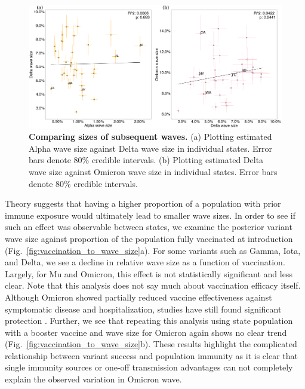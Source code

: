\documentclass[11pt,oneside,letterpaper]{article}
\begin{document}
\begin{figure}[h!]
  \centering
  \includegraphics[width=\linewidth]{figs/wave_size_to_wave_size.png}
  \caption{\textbf{Comparing sizes of subsequent waves.}
    (a) Plotting estimated Alpha wave size against Delta wave size in individual states. Error bars denote 80\% credible intervals.
    (b) Plotting estimated Delta wave size against Omicron wave size in individual states. Error bars denote 80\% credible intervals.
  }
  \label{fig:wave_size_to_wave_size}
\end{figure}

Theory suggests that having a higher proportion of a population with prior immune exposure would ultimately lead to smaller wave sizes.
In order to see if such an effect was observable between states, we examine the posterior variant wave size against proportion of the population fully vaccinated at introduction (Fig.\ \ref{fig:vaccination_to_wave_size}a).
For some variants such as Gamma, Iota, and Delta, we see a decline in relative wave size as a function of vaccination.
Largely, for Mu and Omicron, this effect is not statistically significant and less clear.
Note that this analysis does not say much about vaccination efficacy itself.
Although Omicron showed partially reduced vaccine effectiveness against symptomatic disease and hospitalization, studies have still found significant protection \cite{Kirsebom2022}.
Further, we see that repeating this analysis using state population with a booster vaccine and wave size for Omicron again shows no clear trend (Fig.\ \ref{fig:vaccination_to_wave_size}b).
These results highlight the complicated relationship between variant success and population immunity as it is clear that single immunity sources or one-off transmission advantages can not completely explain the observed variation in Omicron wave.
\end{document}
